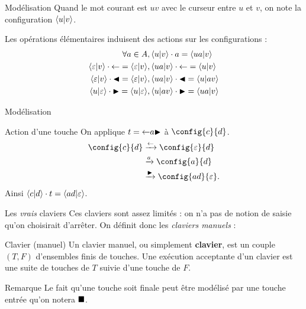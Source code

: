 \documentclass[11pt,french,professionalfonts]{beamer}
\begin{document}
\begin{frame}{Modélisation}
	Quand le mot courant est $uv$ avec le curseur entre $u$ et $v$, on note la configuration $\left\langle u \middle| v \right\rangle$. \pause

	Les opérations élémentaires induisent des actions sur les configurations :
	\begin{align*}
		\forall a \in A&, \left\langle u \middle| v \right\rangle\cdot a = \left\langle ua \middle| v \right\rangle \\
		\left\langle \varepsilon \middle| v \right\rangle\cdot \mathord{\leftarrow} = \left\langle \varepsilon \middle| v \right\rangle &, \left\langle ua \middle| v \right\rangle\cdot \mathord{\leftarrow} = \left\langle u \middle| v \right\rangle \\
		\left\langle \varepsilon \middle| v \right\rangle\cdot \mathord{\blacktriangleleft} = \left\langle \varepsilon \middle| v \right\rangle &, \left\langle ua \middle| v \right\rangle\cdot \mathord{\blacktriangleleft} = \left\langle u \middle| av \right\rangle \\
		\left\langle u \middle| \varepsilon \right\rangle\cdot \mathord{\blacktriangleright} = \left\langle u \middle| \varepsilon \right\rangle &, \left\langle u \middle| av \right\rangle\cdot \mathord{\blacktriangleright} = \left\langle ua \middle| v \right\rangle \\
	\end{align*}
\end{frame}

\begin{frame}{Modélisation}
	\begin{exampleblock}{Action d'une touche}
		On applique $t = \mathord{\leftarrow} a \mathord{\blacktriangleright}$ à $\config{c}{d}$. \pause
		 \begin{align*}
			\config{c}{d} & \act{\retour} \config{\varepsilon}{d}\\
						  & \act{a}       \config{a}{d}\\
						  & \act{\droite} \config{ad}{\varepsilon}.
		\end{align*}
		Ainsi $\left\langle c \middle| d \right\rangle\cdot t = \left\langle ad \middle| \varepsilon \right\rangle$.
	\end{exampleblock}
	
\end{frame}

\begin{frame}{Les \emph{vrais} claviers} 
	Ces claviers sont assez limités : on n'a pas de notion de saisie qu'on choisirait d'arrêter. \pause On définit donc les \emph{claviers manuels} :
    \begin{block}{Clavier (manuel)}
        Un clavier manuel, ou simplement \textbf{clavier}, est un couple $(T,F)$ d'ensembles finis de touches.
        Une exécution acceptante d'un clavier est une suite de touches de $T$ suivie d'une touche de $F$.
    \end{block} \pause
	\begin{exampleblock}{Remarque}
		Le fait qu'une touche soit finale peut être modélisé par une touche entrée qu'on notera $\mathord{\blacksquare}$.
	\end{exampleblock}
\end{frame}
\end{document}
